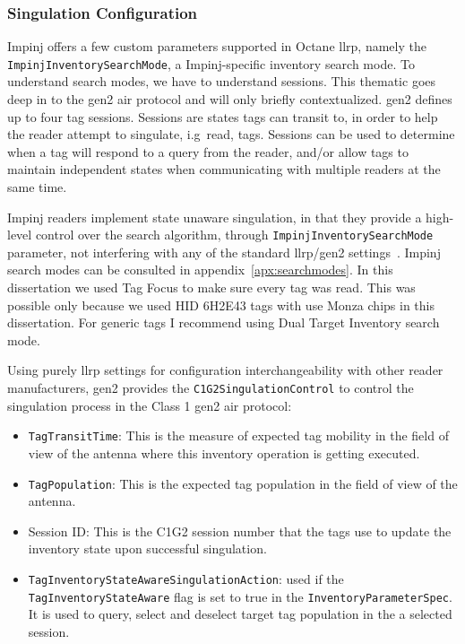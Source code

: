 \subsubsection{Singulation Configuration}

Impinj offers a few custom parameters supported in Octane \ac{llrp}, namely the \texttt{ImpinjInventorySearchMode}, a Impinj-specific inventory search mode. 
To understand search modes, we have to understand sessions. This thematic goes deep in to the \ac{gen2} air protocol and will only briefly contextualized. \ac{gen2} defines up to four tag sessions. Sessions are states tags can transit to, in order to help the reader attempt to singulate, i.g\ read, tags.
Sessions can be used to determine when a tag will respond to a query from the reader, and/or allow tags to maintain independent states when communicating with multiple readers at the same time. 

Impinj readers implement state unaware singulation, in that they provide a high-level control over the search algorithm, through \texttt{ImpinjInventorySearchMode} parameter, not interfering with any of the standard \ac{llrp}/\ac{gen2} settings~\cite{ImpinjOctaneLLRP, UnderstandingEPCGen2}.
Impinj search modes can be consulted in appendix~\ref{apx:searchmodes}.
In this dissertation we used Tag Focus to make sure every tag was read. This was possible only because we used HID 6H2E43 tags with use Monza chips in this dissertation. For generic tags I recommend using Dual Target Inventory search mode.

Using purely \ac{llrp} settings for configuration interchangeability with other reader manufacturers, \ac{gen2} provides the \texttt{C1G2SingulationControl} to control the singulation process in the Class 1 \ac{gen2} air protocol:

\begin{itemize}
    \item \texttt{TagTransitTime}: This is the measure of expected tag mobility in the field of view of the antenna where this inventory operation is getting executed.
    \item \texttt{TagPopulation}: This is the expected tag population in the field of view of the antenna.
    \item Session ID: This is the C1G2 session number that the tags use to update the inventory state upon successful singulation.
    \item \texttt{TagInventoryStateAwareSingulationAction}: used if the \texttt{TagInventoryStateAware} flag is set to true in the \texttt{InventoryParameterSpec}. It is used to query, select and deselect target tag population in the a selected session.
\end{itemize}

